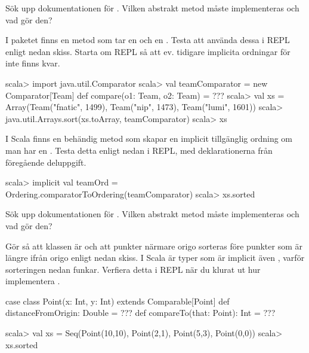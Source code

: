 \Subtask\Pen Sök upp dokumentationen för . Vilken abstrakt metod måste implementeras och vad gör den?

\Subtask  I paketet  finns en metod  som tar en  och en . Testa att använda dessa i REPL enligt nedan skiss. Starta om REPL så att ev. tidigare implicita ordningar för  inte finns kvar.
\begin{REPL}
scala> import java.util.Comparator
scala> val teamComparator = new Comparator[Team]{
         def compare(o1: Team, o2: Team) = ???
       }
scala> val xs =
         Array(Team("fnatic", 1499), Team("nip", 1473), Team("lumi", 1601))
scala> java.util.Arrays.sort(xs.toArray, teamComparator)
scala> xs
\end{REPL}

\Subtask I Scala finns en behändig metod  som skapar en implicit tillgänglig ordning om man har en . Testa detta enligt nedan i REPL, med deklarationerna från föregående deluppgift.
\begin{REPL}
scala> implicit val teamOrd = Ordering.comparatorToOrdering(teamComparator)
scala> xs.sorted
\end{REPL}



\Subtask\Pen Sök upp dokumentationen för . Vilken abstrakt metod måste implementeras och vad gör den?

\Subtask Gör så att klassen  är  och att punkter närmare origo sorteras före punkter som är längre ifrån origo enligt nedan skiss. I Scala är typer som är  implicit även , varför sorteringen nedan funkar. Verfiera detta i REPL när du klurat ut hur implementera .

\begin{Code}
case class Point(x: Int, y: Int) extends Comparable[Point] {
  def distanceFromOrigin: Double = ???
  def compareTo(that: Point): Int = ???
}
\end{Code}
\begin{REPL}
scala> val xs = Seq(Point(10,10), Point(2,1), Point(5,3), Point(0,0))
scala> xs.sorted
\end{REPL}


